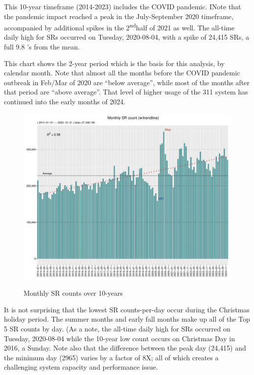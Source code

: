 \documentclass[12pt, titlepage]{article}
\begin{document}
This 10-year timeframe (2014-2023) includes the COVID pandemic. INote that the pandemic
impact reached a peak in the July-September 2020 timeframe, accompanied by additional spikes
in the 2\textsuperscript{nd}half of 2021 as well. The all-time daily high for SRs occurred on Tuesday, 2020-08-04, 
with a spike of 24,415 SRs, a full 9.8 \textsigma's from the mean. 

This chart shows the 2-year period which is the basis for this analysis, by calendar month. 
Note that almost all the months before the COVID pandemic outbreak in Feb/Mar
of 2020 are ``below average'', while most of the months after that period are ``above average''. That level of higher usage
of the 311 system has continued into the early months of 2024.

\begin{figure}[htbp]
  \centering
   \caption{Monthly SR counts over 10-years}
  \includegraphics[width=\textwidth]{10-year-monthly.pdf}
  \label{fig:monthly-counts}
\end{figure}

It is not surprising that the lowest SR counts-per-day occur during the Christmas holiday period. The summer months and early
fall months make up all of the Top 5 SR counts by day. (As a note, the all-time daily high for SRs occurred on Tuesday, 2020-08-04 while the 10-year
low count occurs on Christmas Day in 2016, a Sunday. Note also that the difference between the peak day (24,415) and the minimum day (2965) varies
by a factor of 8X; all of which creates a challenging  system capacity and performance issue.
\end{document}
